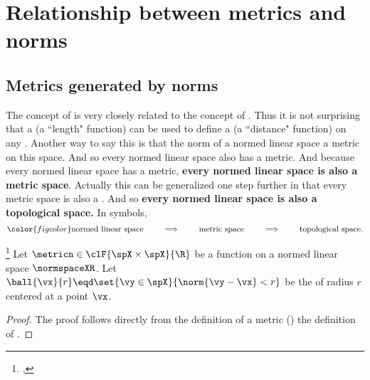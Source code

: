 \section{Relationship between metrics and norms}
\subsection{Metrics generated by norms}


The concept of  is very closely related to the concept of .
Thus it is not surprising that a  (a ``length" function)
can be used to define a  (a ``distance" function)
on any  .
Another way to say this is that the norm of a normed linear space
 a metric on this space.
And %
so every normed linear space also has a metric.
And because every normed linear space has a metric,
{\bf every normed linear space is also a metric space}.
Actually this can be generalized one step further in that
every metric space is also a .
And so {\bf every normed linear space is also a topological space.}
In symbols,
\[ \color{figcolor}
   \text{normed linear space}
   \qquad\implies\qquad
   \text{metric space}
   \qquad\implies\qquad
   \text{topological space}.
\]
\begin{theorem}
\label{thm:d=norm}
\footnote{
  ,
  }
Let $\metricn\in\clF{\spX\times\spX}{\R}$ be a function on a  normed linear space $\normspaceXR$.
Let $\ball{\vx}{r}\eqd\set{\vy\in\spX}{\norm{\vy-\vx}<r}$ be the  of radius $r$ centered at a point $\vx$.
\end{theorem}
\begin{proof}
The proof follows directly from the definition of a metric ()
the definition of  .
\end{proof}

